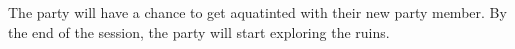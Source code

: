 The party will have a chance to get aquatinted with their new party member.
By the end of the session, the party will start exploring the ruins.
